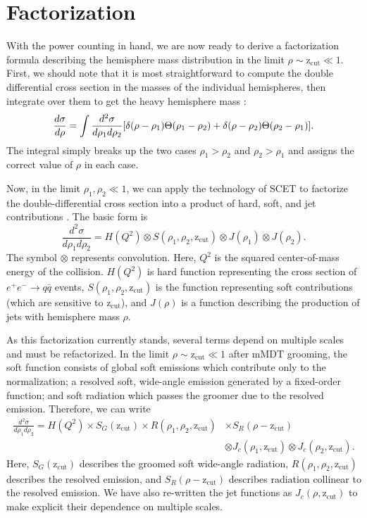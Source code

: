 \documentclass[12pt,twoside,class=../reedthesis, crop=false]{standalone}
\newcommand{\zcut}{\mathrm{z_{cut}}}
\begin{document}
\section{Factorization}
	With the power counting in hand, we are now ready to derive a factorization formula describing the hemisphere mass distribution in the limit $\rho \sim \zcut \ll 1$. First, we should note that it is most straightforward to compute the double differential cross section in the masses of the individual hemispheres, then integrate over them to get the heavy hemisphere mass \cite{chien_resummation_2010}:
	\begin{equation}\label{eq:heavy hemisphere cross section}
		\frac{d\sigma}{d\rho} = \int \frac{d^2\sigma}{d\rho_1d\rho_2}\qty[\delta(\rho - \rho_1)\Theta(\rho_1 - \rho_2) + \delta(\rho - \rho_2)\Theta(\rho_2 - \rho_1)].
	\end{equation}
	The integral simply breaks up the two cases $\rho_1 > \rho_2$ and $\rho_2 > \rho_1$ and assigns the correct value of $\rho$ in each case.

	Now, in the limit $\rho_1, \rho_2 \ll 1$, we can apply the technology of SCET to factorize the double-differential cross section into a product of hard, soft, and jet contributions \cite{frye_factorization_2016,ellis_jet_2010}. The basic form is
	\begin{equation}
		\frac{d^2\sigma}{d\rho_1 d\rho_2} = H(Q^2) \otimes S(\rho_1, \rho_2, \zcut) \otimes J(\rho_1) \otimes J(\rho_2).
	\end{equation}
	The symbol $\otimes$ represents convolution. Here, $Q^2$ is the squared center-of-mass energy of the collision. $H(Q^2)$ is hard function representing the cross section of $e^+ e^- \to q\bar{q}$ events, $S(\rho_1, \rho_2, \zcut)$ is the function representing soft contributions (which are sensitive to $\zcut$), and $J(\rho)$ is a function describing the production of jets with hemisphere mass $\rho$.

	As this factorization currently stands, several terms depend on multiple scales and must be refactorized. In the limit $\rho \sim \zcut \ll 1$ after mMDT grooming, the soft function consists of global soft emissions which contribute only to the normalization; a resolved soft, wide-angle emission generated by a fixed-order function; and soft radiation which passes the groomer due to the resolved emission. Therefore, we can write
	\begin{equation}
	\begin{aligned}
		\frac{d^2\sigma}{d\rho_1 d\rho_2} = H(Q^2) \times S_G(\zcut) \times R(\rho_1, \rho_2, \zcut) &\times S_R(\rho - \zcut) \\
			&\otimes J_c(\rho_1, \zcut) \otimes J_c(\rho_2, \zcut).
	\end{aligned}
	\end{equation}
	Here, $S_G(\zcut)$ describes the groomed soft wide-angle radiation, $R(\rho_1, \rho_2, \zcut)$ describes the resolved emission, and $S_R(\rho - \zcut)$ describes radiation collinear to the resolved emission. We have also re-written the jet functions as $J_c(\rho, \zcut)$ to make explicit their dependence on multiple scales.
\end{document}

